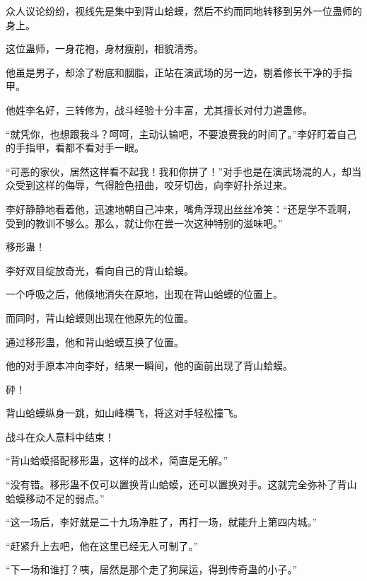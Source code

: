 \begin{this_body}
众人议论纷纷，视线先是集中到背山蛤蟆，然后不约而同地转移到另外一位蛊师的身上。

这位蛊师，一身花袍，身材瘦削，相貌清秀。

他虽是男子，却涂了粉底和胭脂，正站在演武场的另一边，剔着修长干净的手指甲。

他姓李名好，三转修为，战斗经验十分丰富，尤其擅长对付力道蛊修。

“就凭你，也想跟我斗？呵呵，主动认输吧，不要浪费我的时间了。”李好盯着自己的手指甲，看都不看对手一眼。

“可恶的家伙，居然这样看不起我！我和你拼了！”对手也是在演武场混的人，却当众受到这样的侮辱，气得脸色扭曲，咬牙切齿，向李好扑杀过来。

李好静静地看着他，迅速地朝自己冲来，嘴角浮现出丝丝冷笑：“还是学不乖啊，受到的教训不够么。那么，就让你在尝一次这种特别的滋味吧。”

移形蛊！

李好双目绽放奇光，看向自己的背山蛤蟆。

一个呼吸之后，他倏地消失在原地，出现在背山蛤蟆的位置上。

而同时，背山蛤蟆则出现在他原先的位置。

通过移形蛊，他和背山蛤蟆互换了位置。

他的对手原本冲向李好，结果一瞬间，他的面前出现了背山蛤蟆。

砰！

背山蛤蟆纵身一跳，如山峰横飞，将这对手轻松撞飞。

战斗在众人意料中结束！

“背山蛤蟆搭配移形蛊，这样的战术，简直是无解。”

“没有错。移形蛊不仅可以置换背山蛤蟆，还可以置换对手。这就完全弥补了背山蛤蟆移动不足的弱点。”

“这一场后，李好就是二十九场净胜了，再打一场，就能升上第四内城。”

“赶紧升上去吧，他在这里已经无人可制了。”

“下一场和谁打？咦，居然是那个走了狗屎运，得到传奇蛊的小子。”

\end{this_body}

